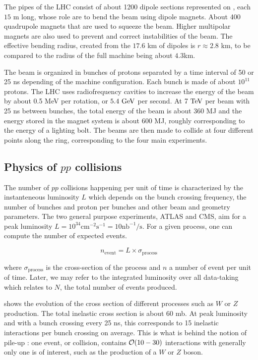    The pipes of the LHC consist of about 1200 dipole sections represented on
    , each $15$ m long, whose role are to bend the beam using dipole
    magnets. About 400 quadrupole magnets that are used to squeeze the
    beam. Higher multipolar magnets are also used to prevent and correct instabilities of
    the beam. The effective bending radius, created from the $17.6$ km of dipoles is
    $r \approx 2.8$ km, to be compared to the radius of the full machine being about $4.3$km.

    The beam is organized in bunches of protons separated by a time interval of 50 or
    25 ns depending of the machine configuration. Each bunch is made of about $10^{11}$
    protons. The LHC uses radiofrequency cavities to increase the energy of the beam by
    about 0.5 MeV per rotation, or $5.4~\text{GeV}$ per second. At $7~\text{TeV}$ per beam with 25 ns
    between bunches, the total energy of the beam is about 360 MJ and the energy stored
    in the magnet system is about 600 MJ, roughly corresponding to the energy of a
    lighting bolt. The beams are then made to collide at four different points along the
    ring, corresponding to the four main experiments.

        \subsection{Physics of $pp$ collisions \label{sec:physicsFromCollisionsAtTheLHC}}

    The number of $pp$ collisions happening per unit of time is characterized by the
    instanteneous luminosity $L$ which depends on the bunch crossing frequency, the
    number of bunches and proton per bunches and other beam and geometry parameters.
    The two general purpose experiments, ATLAS and CMS, aim for a peak luminosity
    $ L = 10^{34} \text{cm}^{-2} \text{s}^{-1} = 10 \text{nb}^{-1} / \text{s}$. For a
    given process, one can compute the number of expected events.

    $$ n_\text{event} = L \times \sigma_\text{process} $$

    where $\sigma_\text{process}$ is the cross-section of the process and $n$ a number
    of event per unit of time. Later, we may refer to the integrated luminosity over all
    data-taking which relates to $N$, the total number of events produced.

     shows the evolution of the cross section of different
    processes such as $W$ or $Z$ production. The total inelastic cross section is about
    60 mb. At peak luminosity and with a bunch crossing every 25 ns, this corresponds
    to 15 inelastic interactions per bunch crossing on average. This is what is behind
    the notion of pile-up : one event, or collision, contains $\mathcal{O}(10-30)$
    interactions with generally only one is of interest, such as the production of a $W$
    or $Z$ boson.

